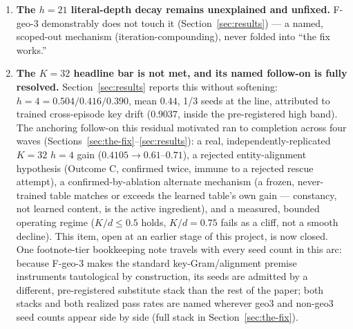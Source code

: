 \begin{enumerate}
\item \textbf{The $h{=}21$ literal-depth decay remains unexplained and
unfixed.} F-geo-3 demonstrably does not touch it
(Section~\ref{sec:results}) --- a named, scoped-out mechanism
(iteration-compounding), never folded into ``the fix works.''

\item \textbf{The $K{=}32$ headline bar is not met, and its named
follow-on is fully resolved.} Section~\ref{sec:results} reports this
without softening: $h{=}4{=}0.504/0.416/0.390$, mean $0.44$, 1/3 seeds at
the line, attributed to trained cross-episode key drift ($0.9037$, inside
the pre-registered high band). The anchoring follow-on this residual
motivated ran to completion across four waves
(Sections~\ref{sec:the-fix}--\ref{sec:results}): a real,
independently-replicated $K{=}32$ $h{=}4$ gain ($0.4105\to0.61$--$0.71$),
a rejected entity-alignment hypothesis (Outcome C, confirmed twice,
immune to a rejected rescue attempt), a confirmed-by-ablation alternate
mechanism (a frozen, never-trained table matches or exceeds the learned
table's own gain --- constancy, not learned content, is the active
ingredient), and a measured, bounded operating regime ($K/d\leq0.5$
holds, $K/d{=}0.75$ fails as a cliff, not a smooth decline). This item,
open at an earlier stage of this project, is now closed. One
footnote-tier bookkeeping note travels with every seed count in this
arc: because F-geo-3 makes the standard key-Gram/alignment premise
instruments tautological by construction, its seeds are admitted by a
different, pre-registered substitute stack than the rest of the paper;
both stacks and both realized pass rates are named wherever geo3 and
non-geo3 seed counts appear side by side (full stack in
Section~\ref{sec:the-fix}).


\end{enumerate}
